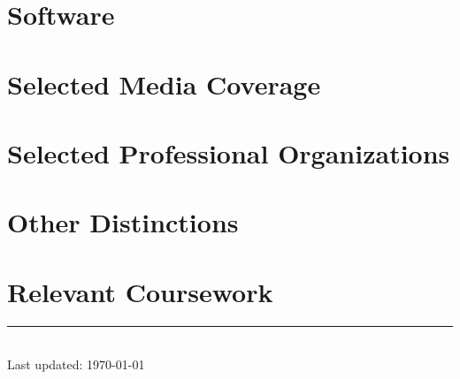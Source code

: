 \documentclass[11pt]{article}
\newcommand{\myinput}[1]{
  
}
\begin{document}
\section*{Software}
\label{software}
\newrefcontext[labelprefix=S]
\printbibliography[heading=none,resetnumbers=true,keyword=S]


\section*{Selected Media Coverage}
\label{media}
\myinput{media}


\section*{Selected Professional Organizations}
\label{organizations}
\myinput{organizations}


\section*{Other Distinctions}
\label{other-distinctions}
\myinput{other_awards}

{}
\section*{Relevant Coursework}
\label{coursework}
\myinput{coursework}

\centering
\rule{0.25\linewidth}{0.4pt}\\
\medskip
Last updated: \today
\end{document}
